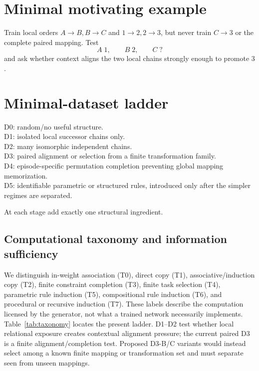 \documentclass[10pt]{article}
\begin{document}
\section{Minimal motivating example}
Train local orders \(A\to B,B\to C\) and \(1\to2,2\to3\), but never train \(C\to3\) or the complete paired mapping. Test
\[
A\;1,\qquad B\;2,\qquad C\;?
\]
and ask whether context aligns the two local chains strongly enough to promote \(3\).

\section{Minimal-dataset ladder}
D0: random/no useful structure.\\
D1: isolated local successor chains only.\\
D2: many isomorphic independent chains.\\
D3: paired alignment or selection from a finite transformation family.\\
D4: episode-specific permutation completion preventing global mapping memorization.\\
D5: identifiable parametric or structured rules, introduced only after the simpler regimes are separated.

At each stage add exactly one structural ingredient.

\subsection{Computational taxonomy and information sufficiency}
We distinguish in-weight association (T0), direct copy (T1), associative/induction copy (T2), finite constraint completion (T3), finite task selection (T4), parametric rule induction (T5), compositional rule induction (T6), and procedural or recursive induction (T7). These labels describe the computation licensed by the generator, not what a trained network necessarily implements. Table~\ref{tab:taxonomy} locates the present ladder. D1--D2 test whether local relational exposure creates contextual alignment pressure; the current paired D3 is a finite alignment/completion test. Proposed D3-B/C variants would instead select among a known finite mapping or transformation set and must separate seen from unseen mappings.
\end{document}
